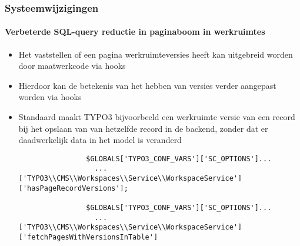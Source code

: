 \begin{frame}[fragile]
	\frametitle{Systeemwijzigingen}
	\framesubtitle{Verbeterde SQL-query reductie in paginaboom in werkruimtes}

	\lstset{basicstyle=\tiny\ttfamily}

	\begin{itemize}

		\item Het vaststellen of een pagina werkruimteversies heeft kan uitgebreid
		 	worden door maatwerkcode via hooks

		\item Hierdoor kan de betekenis van het hebben van versies verder aangepast
		 	worden via hooks

		\item Standaard maakt TYPO3 bijvoorbeeld een werkruimte versie van een record bij
		 	het opslaan van van hetzelfde record in de backend, zonder dat er daadwerkelijk
		 	data in het model is veranderd

			\begin{lstlisting}
				$GLOBALS['TYPO3_CONF_VARS']['SC_OPTIONS']...
				  ...['TYPO3\\CMS\\Workspaces\\Service\\WorkspaceService']['hasPageRecordVersions'];

				$GLOBALS['TYPO3_CONF_VARS']['SC_OPTIONS']...
				  ...['TYPO3\\CMS\\Workspaces\\Service\\WorkspaceService']['fetchPagesWithVersionsInTable']
			\end{lstlisting}

	\end{itemize}

\end{frame}


